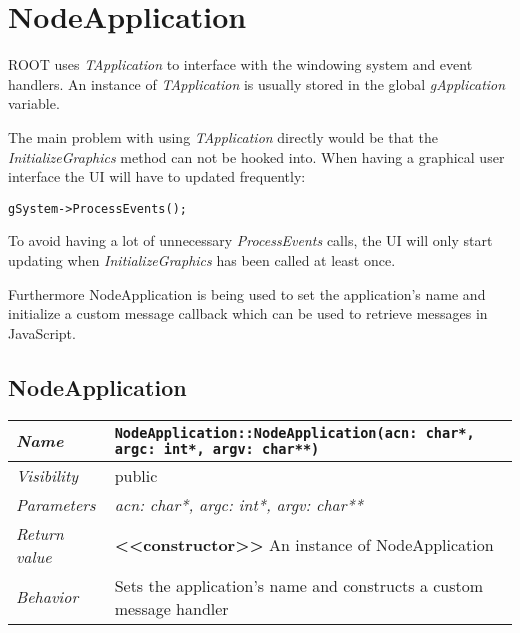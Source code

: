 \chapter{NodeApplication}
ROOT uses \textit{TApplication} to interface with the windowing system and event handlers.
An instance of \textit{TApplication} is usually stored in the global \textit{gApplication} variable.

The main problem with using \textit{TApplication} directly would be that the \textit{InitializeGraphics} method can not be hooked into.
When having a graphical user interface the UI will have to updated frequently:
\begin{verbatim}
gSystem->ProcessEvents();
\end{verbatim}
To avoid having a lot of unnecessary \textit{ProcessEvents} calls, the UI will only start updating when \textit{InitializeGraphics} has been called at least once.

Furthermore NodeApplication is being used to set the application's name and initialize a custom message callback which can be used to retrieve messages in JavaScript.

\section{NodeApplication}
\begin{longtable}{p{3cm} @{\hskip 1cm} p{12cm}}
 \hline
\textit{Name} & \texttt{NodeApplication::NodeApplication(acn: char*, argc: int*, argv: char**)}\\
\hline
 \textit{Visibility} & public\\
\hline
\textit{Parameters} & \textit{acn: char*, argc: int*, argv: char**}\\
\hline
\textit{Return value} & \textbf{<<constructor>>} An instance of NodeApplication\\
  \hline
 \textit{Behavior} & Sets the application's name and constructs a custom message handler \\
\hline
\end{longtable} \pagebreak
